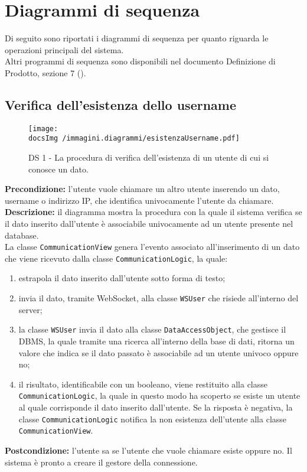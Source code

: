 \section{Diagrammi di sequenza}
Di seguito sono riportati i diagrammi di sequenza per quanto riguarda le operazioni principali del sistema.\\
Altri programmi di sequenza sono disponibili nel documento Definizione di Prodotto, sezione 7 (\textit{\DefinizioneDiProdotto}).

	\subsection{Verifica dell'esistenza dello username}
		\begin{center}
			\begin{figure}[htbp]
				\centering
				\texttt{[image: \\docsImg /immagini.diagrammi/esistenzaUsername.pdf]}
			\caption{DS 1 - La procedura di verifica dell'esistenza di un utente di cui si conosce un dato.}	
			\end{figure}
		\end{center}	
	\noindent \textbf{Precondizione: }l'utente vuole chiamare un altro utente inserendo un dato, username o indirizzo IP\g , che identifica univocamente l'utente da chiamare.\\
	\textbf{Descrizione: }il diagramma mostra la procedura con la quale il sistema verifica se il dato inserito dall'utente è associabile univocamente ad un utente presente nel database\g.\\
	La classe \texttt{CommunicationView} genera l'evento associato all'inserimento di un dato che viene ricevuto dalla classe \texttt{CommunicationLogic}, la quale:
	\begin{enumerate}
	\item estrapola il dato inserito dall'utente sotto forma di testo;
	\item invia il dato, tramite WebSocket\g , alla classe \texttt{WSUser} che risiede all'interno del server\g ;
	\item la classe \texttt{WSUser} invia il dato alla classe \texttt{DataAccessObject}, che gestisce il DBMS\g , la quale tramite una ricerca all'interno della base di dati, ritorna un valore che indica se il dato passato è associabile ad un utente univoco oppure no;
	\item il risultato, identificabile con un booleano\g, viene restituito alla classe\\ \texttt{CommunicationLogic}, la quale in questo modo ha scoperto se esiste un utente al quale corrisponde il dato inserito dall'utente. Se la risposta è negativa, la classe \texttt{CommunicationLogic} notifica la non esistenza dell'utente alla classe \texttt{CommunicationView}.
	\end{enumerate}
	\textbf{Postcondizione: }l'utente sa se l'utente che vuole chiamare esiste oppure no. Il sistema è pronto a creare il gestore della connessione.